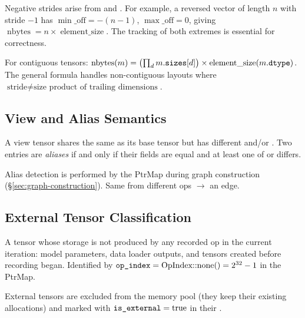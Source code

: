 \begin{remark}
Negative strides arise from  and .
For example, a reversed vector of length $n$ with stride $-1$ has
$\min\_\text{off} = -(n-1)$, $\max\_\text{off} = 0$, giving
$\operatorname{nbytes} = n \times \operatorname{element\_size}$.
The tracking of both extremes is essential for correctness.
\end{remark}

\begin{property}
For contiguous tensors: $\operatorname{nbytes}(m)
= \bigl(\prod_{d} m.\texttt{sizes}[d]\bigr) \times \operatorname{element\_size}(m.\texttt{dtype})$.
The general formula handles non-contiguous layouts
where $\text{stride} \neq \text{size product of trailing dimensions}$.
\end{property}

\subsection{View and Alias Semantics}

\begin{definition}
A view tensor shares the same  as its base tensor
but has different  and/or .
Two  entries are \emph{aliases} if and only if
their  fields are equal and at least one of
 or  differs.
\end{definition}

Alias detection is performed by the PtrMap during graph construction (\S\ref{sec:graph-construction}).
Same  from different ops $\to$ an  edge.

\subsection{External Tensor Classification}

\begin{definition}
\label{def:external-tensor}
A tensor whose storage is not produced by any recorded op in the
current iteration: model parameters, data loader outputs, and
tensors created before recording began.  Identified by
$\texttt{op\_index} = \text{OpIndex::none()} = 2^{32}-1$ in the PtrMap.
\end{definition}

External tensors are excluded from the memory pool
(they keep their existing allocations) and marked with
$\texttt{is\_external} = \text{true}$ in their .

